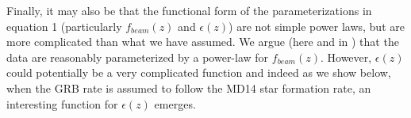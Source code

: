 \documentclass[fleqn,usenatbib,useAMS]{mnras}
\begin{document}
 






Finally, it may also be that the functional form of the parameterizations in equation 1 (particularly $f_{beam}(z)$ and $\epsilon(z)$) are not simple power laws, but are more complicated than what we have assumed.  We argue (here and in \cite{LR19,LR20}) that the data are reasonably parameterized by a power-law for $f_{beam}(z)$.  However, $\epsilon(z)$ could potentially be a very complicated function and indeed as we show below, when the GRB rate is assumed to follow the MD14 star formation rate, an interesting function for $\epsilon(z)$ emerges.
\end{document}
